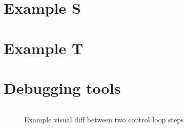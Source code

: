 \section{Example S}

\section{Example T}

\section{Debugging tools}

\begin{figure}[H]
    \inputminted[fontsize=\tiny]{diff}{Figures/APIA_Architecture/Examples/Authorization/Example_A/diff_test.snippet.txt}
    \caption{Example visual diff between two control loop steps}
    \label{fig:apia_diff_test}
\end{figure}
